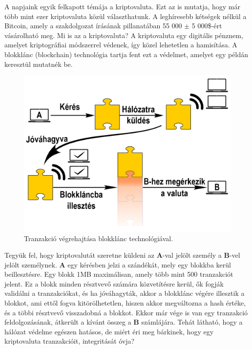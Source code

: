 A napjaink egyik felkapott témája a kriptovaluta. Ezt az is mutatja, hogy már több mint ezer kriptovaluta közül választhatunk. A leghíresebb kétségek nélkül a Bitcoin, amely a szakdolgozat írásának pillanatában 55 000 $\pm$ 5 000\$-ért vásárolható meg. Mi is az a kriptovaluta? A kriptovaluta egy digitális pénznem, amelyet kriptográfiai módszerrel védenek, így közel lehetetlen a hamisítása. A blokklánc (blockchain) technológia tartja fent ezt a védelmet, amelyet egy példán keresztül mutatnék be.

\begin{figure}[ht]
\centering
\includegraphics[scale=0.22]{images/krypto.png}
\caption{Tranzakció végrehajtása blokklánc technológiával.}
\label{fig:krypto}
\end{figure}

Tegyük fel, hogy kriptovalutát szeretne küldeni az \textbf{A}-val jelölt személy a \textbf{B}-vel jelölt személynek. \textbf{A} egy kérésben jelzi a szándékát, mely egy blokkba kerül beillesztésre. Egy blokk 1MB maximálisan, amely több mint 500 tranzakciót jelent. Ez a blokk minden résztvevő számára közvetítésre kerül, ők fogják validálni a tranzakciókat, és ha jóváhagyták, akkor a blokklánc végére illesztik a blokkot, ami ettől fogva kitörölhetetlen, hiszen akkor megváltozna a hash értéke, és a többi résztvevő visszadobná a blokkot. Ekkor már vége is van egy tranzakció feldolgozásának, átkerült a kívánt összeg a \textbf{B} számlájára.
Tehát látható, hogy a hálózat védelme egészen hatásos, de miért éri meg bárkinek, hogy egy kriptovaluta tranzakcióit, integritását óvja?

